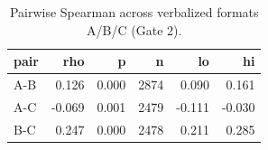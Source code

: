 \begin{table}
\caption{Pairwise Spearman across verbalized formats A/B/C (Gate 2).}
\label{tab:t5_h0_format_agreement}
\begin{tabular}{lrrrrr}
\toprule
pair & rho & p & n & lo & hi \\
\midrule
A-B & 0.126 & 0.000 & 2874 & 0.090 & 0.161 \\
A-C & -0.069 & 0.001 & 2479 & -0.111 & -0.030 \\
B-C & 0.247 & 0.000 & 2478 & 0.211 & 0.285 \\
\bottomrule
\end{tabular}
\end{table}
